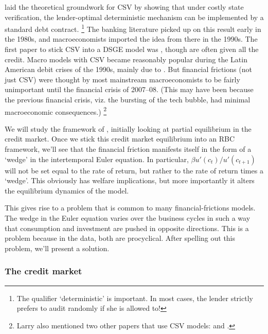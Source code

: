 \documentclass[11pt,letterpaper,reqno,oneside]{article}
\begin{document}
\textcite{Townsend1979} laid the theoretical groundwork for CSV by showing that under costly state verification, the lender-optimal deterministic mechanism can be implemented by a standard debt contract.%
	\footnote{The qualifier `deterministic' is important. In most cases, the lender strictly prefers to audit randomly if she is allowed to!}
The banking literature picked up on this result early in the 1980s, and macroeconomists imported the idea from there in the 1990s. The first paper to stick CSV into a DSGE model was \textcite{CarlstromFuerst1997}, though \textcite{BernankeGertlerGilchrist1999} are often given all the credit. Macro models with CSV became reasonably popular during the Latin American debit crises of the 1990s, mainly due to \textcite{ChangVelasco2000}. But financial frictions (not just CSV) were thought by most mainstream macroeconomists to be fairly unimportant until the financial crisis of 2007--08. (This may have been because the previous financial crisis, viz. the bursting of the tech bubble, had minimal macroeconomic consequences.)%
	\footnote{Larry also mentioned two other papers that use CSV models: \textcite{ChristianoMottoRostagno2003} and \textcite{ChristianoMottoRostagno2014}.}

We will study the framework of \textcite{BernankeGertlerGilchrist1999}, initially looking at partial equilibrium in the credit market. Once we stick this credit market equilibrium into an RBC framework, we'll see that the financial friction manifests itself in the form of a `wedge' in the intertemporal Euler equation. In particular, $\beta u'(c_t)/u'(c_{t+1})$ will not be set equal to the rate of return, but rather to the rate of return times a `wedge'. This obviously has welfare implications, but more importantly it alters the equilibrium dynamics of the model.

This gives rise to a problem that is common to many financial-frictions models. The wedge in the Euler equation varies over the business cycles in such a way that consumption and investment are pushed in opposite directions. This is a problem because in the data, both are procyclical. After spelling out this problem, we'll present a solution.



\subsubsection{The credit market}
\label{sec:30Nov2015:CSV:credit_market}
\end{document}
